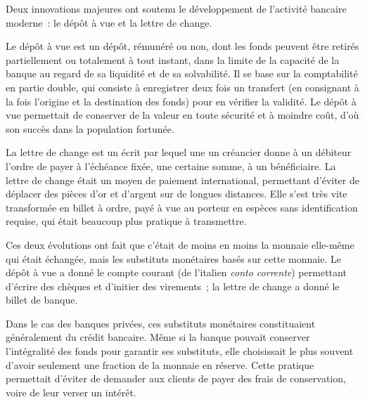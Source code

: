 Deux innovations majeures ont soutenu le développement de l'activité bancaire moderne~: le dépôt à vue et la lettre de change.

Le dépôt à vue est un dépôt, rémunéré ou non, dont les fonds peuvent être retirés partiellement ou totalement à tout instant, dans la limite de la capacité de la banque au regard de sa liquidité et de sa solvabilité. Il se base sur la comptabilité en partie double, qui consiste à enregistrer deux fois un transfert (en consignant à la fois l'origine et la destination des fonds) pour en vérifier la validité. Le dépôt à vue permettait de conserver de la valeur en toute sécurité et à moindre coût, d'où son succès dans la population fortunée.

La lettre de change est un écrit par lequel une un créancier donne à un débiteur l'ordre de payer à l'échéance fixée, une certaine somme, à un bénéficiaire. La lettre de change était un moyen de paiement international, permettant d'éviter de déplacer des pièces d'or et d'argent sur de longues distances. Elle s'est très vite transformée en billet à ordre, payé à vue au porteur en espèces sans identification requise, qui était beaucoup plus pratique à transmettre.

Ces deux évolutions ont fait que c'était de moins en moins la monnaie elle-même qui était échangée, mais les substituts monétaires basés sur cette monnaie. Le dépôt à vue a donné le compte courant (de l'italien \emph{conto corrente}) permettant d'écrire des chèques et d'initier des virements~; la lettre de change a donné le billet de banque.

Dans le cas des banques privées, ces substituts monétaires constituaient généralement du crédit bancaire. Même si la banque pouvait conserver l'intégralité des fonds pour garantir ses substituts, elle choisissait le plus souvent d'avoir seulement une fraction de la monnaie en réserve. Cette pratique permettait d'éviter de demander aux clients de payer des frais de conservation, voire de leur verser un intérêt.

